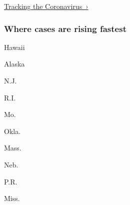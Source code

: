 \href{https://www.nytimes3xbfgragh.onion/interactive/2020/us/coronavirus-us-cases.html}{Tracking
the Coronavirus~›}

\href{https://www.nytimes3xbfgragh.onion/interactive/2020/us/coronavirus-us-cases.html}{}

\hypertarget{where-cases-are-rising-fastest}{%
\subsubsection{\texorpdfstring{Where cases are \textbf{rising}
fastest}{Where cases are rising fastest}}\label{where-cases-are-rising-fastest}}

\href{https://www.nytimes3xbfgragh.onion/interactive/2020/us/hawaii-coronavirus-cases.html}{}

Hawaii

\href{https://www.nytimes3xbfgragh.onion/interactive/2020/us/alaska-coronavirus-cases.html}{}

Alaska

\href{https://www.nytimes3xbfgragh.onion/interactive/2020/us/new-jersey-coronavirus-cases.html}{}

N.J.

\href{https://www.nytimes3xbfgragh.onion/interactive/2020/us/rhode-island-coronavirus-cases.html}{}

R.I.

\href{https://www.nytimes3xbfgragh.onion/interactive/2020/us/missouri-coronavirus-cases.html}{}

Mo.

\href{https://www.nytimes3xbfgragh.onion/interactive/2020/us/oklahoma-coronavirus-cases.html}{}

Okla.

\href{https://www.nytimes3xbfgragh.onion/interactive/2020/us/massachusetts-coronavirus-cases.html}{}

Mass.

\href{https://www.nytimes3xbfgragh.onion/interactive/2020/us/nebraska-coronavirus-cases.html}{}

Neb.

\href{https://www.nytimes3xbfgragh.onion/interactive/2020/us/puerto-rico-coronavirus-cases.html}{}

P.R.

\href{https://www.nytimes3xbfgragh.onion/interactive/2020/us/mississippi-coronavirus-cases.html}{}

Miss.

\href{https://www.nytimes3xbfgragh.onion/interactive/2020/us/south-dakota-coronavirus-cases.html}{}

